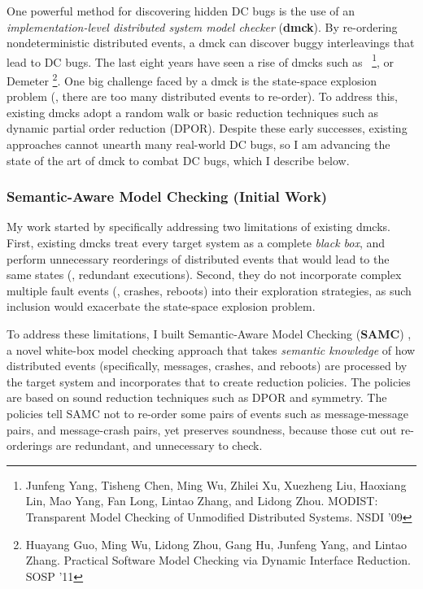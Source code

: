 \documentclass[11pt]{article}
\begin{document}
One powerful method for discovering hidden DC bugs is the use of an
\textit{implementation-level distributed system model checker} (\textbf{dmck}).
By re-ordering nondeterministic distributed events, a dmck can discover buggy
interleavings that lead to DC bugs. The last eight years have seen a rise of
dmcks such as 
\modist\ \footnote{Junfeng Yang, Tisheng Chen, Ming
Wu, Zhilei Xu, Xuezheng Liu, Haoxiang Lin, Mao Yang, Fan Long, Lintao Zhang, and
Lidong Zhou. MODIST: Transparent Model Checking of Unmodified Distributed
Systems. NSDI '09}, or Demeter \footnote{Huayang Guo, Ming Wu, Lidong Zhou, Gang
Hu, Junfeng Yang, and Lintao Zhang. Practical Software Model Checking via
Dynamic Interface Reduction. SOSP '11}. One big challenge faced by a dmck is the
state-space explosion problem (\ie, there are too many distributed events to
re-order). To address this, existing dmcks adopt a random walk or basic
reduction techniques such as dynamic partial order reduction (DPOR). Despite
these early successes, existing approaches cannot unearth many real-world DC
bugs, so I am advancing the state of the art of dmck to combat DC bugs, which I
describe below.

\subsubsection*{Semantic-Aware Model Checking (Initial Work)} 

My work started by specifically addressing two limitations of existing dmcks.
First, existing dmcks treat every target system as a complete \textit{black
box}, and perform unnecessary reorderings of distributed events that
would lead to the same states (\ie, redundant executions). Second,
they do not incorporate complex multiple fault events (\eg, crashes, reboots)
into their exploration strategies, as such inclusion would exacerbate the
state-space explosion problem.

To address these limitations, I built Semantic-Aware Model Checking
(\textbf{SAMC}) \cite{Leesatapornwongsa+15-SamcIssta,Leesatapornwongsa+14-Samc},
a novel white-box model checking approach that takes \textit{semantic knowledge}
of how distributed events (specifically, messages, crashes, and reboots) are
processed by the target system and incorporates that to create reduction
policies. The policies are based on sound reduction techniques such as DPOR and
symmetry. The policies tell SAMC not to re-order some pairs of events such as
message-message pairs, and message-crash pairs, yet preserves soundness, because
those cut out re-orderings are redundant, and unnecessary to check.
\end{document}
